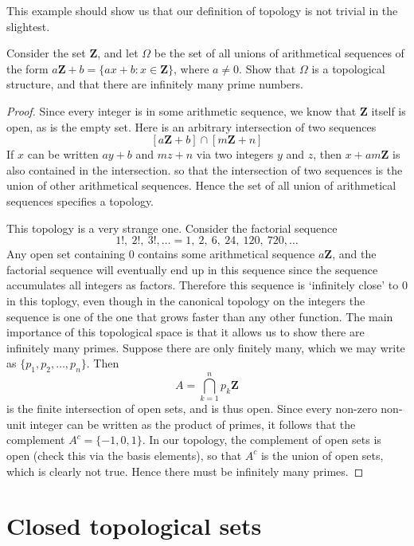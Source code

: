 This example should show us that our definition of topology is not trivial in the slightest.

\begin{exercise}
    Consider the set $\mathbf{Z}$, and let $\Omega$ be the set of all unions of arithmetical sequences of the form $a\mathbf{Z} + b = \{ ax + b: x \in \mathbf{Z}\}$, where $a \neq 0$. Show that $\Omega$ is a topological structure, and that there are infinitely many prime numbers.
\end{exercise}
\begin{proof}
    Since every integer is in some arithmetic sequence, we know that $\mathbf{Z}$ itself is open, as is the empty set. Here is an arbitrary intersection of two sequences
    \[ [a\mathbf{Z} + b] \cap [m\mathbf{Z} + n] \]
    If $x$ can be written $ay + b$ and $mz + n$ via two integers $y$ and $z$, then $x + am\mathbf{Z}$ is also contained in the intersection. so that the intersection of two sequences is the union of other arithmetical sequences. Hence the set of all union of arithmetical sequences specifies a topology.

    This topology is a very strange one. Consider the factorial sequence
    \[ 1!,\ 2!,\ 3!, \dots = 1,\ 2,\ 6,\ 24,\ 120,\ 720, \dots \]
    Any open set containing $0$ contains some arithmetical sequence $a\mathbf{Z}$, and the factorial sequence will eventually end up in this sequence since the sequence accumulates all integers as factors. Therefore this sequence is `infinitely close' to 0 in this toplogy, even though in the canonical topology on the integers the sequence is one of the one that grows faster than any other function. The main importance of this topological space is that it allows us to show there are infinitely many primes. Suppose there are only finitely many, which we may write as $\{ p_1, p_2, \dots, p_n \}$. Then
    \[ A = \bigcap_{k = 1}^n p_k\mathbf{Z} \]
    is the finite intersection of open sets, and is thus open. Since every non-zero non-unit integer can be written as the product of primes, it follows that the complement $A^c = \{ -1,0,1 \}$. In our topology, the complement of open sets is open (check this via the basis elements), so that $A^c$ is the union of open sets, which is clearly not true. Hence there must be infinitely many primes.
\end{proof}

\section{Closed topological sets}

